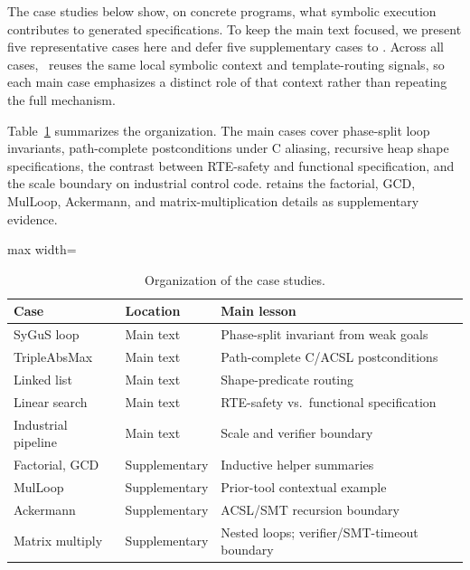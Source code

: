 \label{sec:case}

The case studies below show, on concrete programs, what symbolic execution contributes to generated specifications. To keep the main text focused, we present five representative cases here and defer five supplementary cases to . Across all cases, \toolname\ reuses the same local symbolic context and template-routing signals, so each main case emphasizes a distinct role of that context rather than repeating the full mechanism.

Table~\ref{tab:case-study-map} summarizes the organization. The main cases cover phase-split loop invariants, path-complete postconditions under C aliasing, recursive heap shape specifications, the contrast between RTE-safety and functional specification, and the scale boundary on industrial control code.  retains the factorial, GCD, MulLoop, Ackermann, and matrix-multiplication details as supplementary evidence.

\begin{table}[H]
  \centering
  \caption{Organization of the case studies.}
  \label{tab:case-study-map}
  \begin{adjustbox}{max width=\linewidth}
  \begin{tabular}{lll}
    \toprule
    \textbf{Case} & \textbf{Location} & \textbf{Main lesson} \\
    \midrule
    SyGuS loop & Main text & Phase-split invariant from weak goals \\
    TripleAbsMax & Main text & Path-complete C/ACSL postconditions \\
    Linked list & Main text & Shape-predicate routing \\
    Linear search & Main text & RTE-safety vs.\ functional specification \\
    Industrial pipeline & Main text & Scale and verifier boundary \\
    Factorial, GCD & Supplementary & Inductive helper summaries \\
    MulLoop & Supplementary & Prior-tool contextual example \\
    Ackermann & Supplementary & ACSL/SMT recursion boundary \\
    Matrix multiply & Supplementary & Nested loops; verifier/SMT-timeout boundary \\
    \bottomrule
  \end{tabular}%
  \end{adjustbox}
\end{table}

